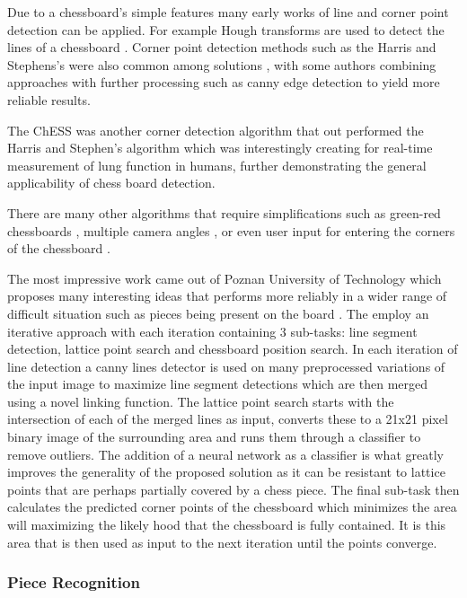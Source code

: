Due to a chessboard's simple features many early works of line and corner point detection can be applied.  For example Hough 
transforms \cite{} are used to detect the lines of a chessboard \cite{}.  Corner point detection methods such as the 
Harris and Stephens's \cite{} were also common among solutions \cite{}, with some authors combining approaches with further 
processing such as canny edge detection \cite{} to yield more reliable results.

The ChESS was another corner detection algorithm that out performed the Harris and Stephen's algorithm \cite{} which was 
interestingly creating for real-time measurement of lung function in humans, further demonstrating the general applicability 
of chess board detection.

There are many other algorithms that require simplifications such as green-red chessboards \cite{}, multiple camera angles \cite{}, 
or even user input for entering the corners of the chessboard \cite{}.

The most impressive work came out of Poznan University of Technology which proposes many interesting ideas that performs more 
reliably in a wider range of difficult situation such as pieces being present on the board \cite{}.  The employ an iterative 
approach with each iteration containing 3 sub-tasks: line segment detection, lattice point search and chessboard position search.
In each iteration of line detection a canny lines detector \cite{} is used on many preprocessed variations of the input image 
to maximize line segment detections which are then merged using a novel linking function. The lattice point search starts with 
the intersection of each of the merged lines as input, converts these to a 21x21 pixel binary image of the surrounding area and 
runs them through a classifier to remove outliers.  The addition of a neural network as a classifier is what greatly improves 
the generality of the proposed solution as it can be resistant to lattice points that are perhaps partially covered by a chess piece.
The final sub-task then calculates the predicted corner points of the chessboard which minimizes the area will maximizing the 
likely hood that the chessboard is fully contained.  It is this area that is then used as input to the next iteration until the 
points converge.  

\subsubsection{Piece Recognition}

